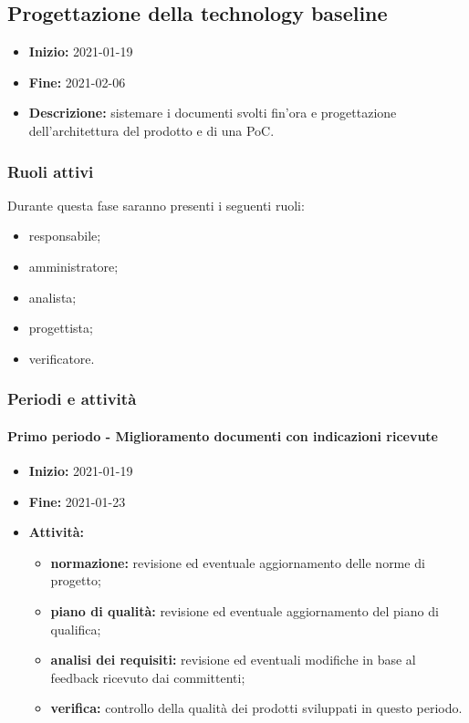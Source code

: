 \subsection{Progettazione della technology baseline} \label{_pianificazioneProgettazioneTechnologyBaseline}
\begin{itemize}
    \item []\textbf{Inizio:} 2021-01-19
    \item []\textbf{Fine:} 2021-02-06
    \item []\textbf{Descrizione:} sistemare i documenti svolti fin'ora e progettazione dell'architettura del prodotto e di una PoC.
\end{itemize}

\subsubsection{Ruoli attivi}
Durante questa fase saranno presenti i seguenti ruoli:
\begin{itemize}
    \item responsabile;
    \item amministratore;
    \item analista;
    \item progettista;
    \item verificatore.
\end{itemize}

\subsubsection{Periodi e attività}

\paragraph[Primo periodo]{Primo periodo - \textnormal{Miglioramento documenti con indicazioni ricevute}}
\begin{itemize}
    \item [] \textbf{Inizio:} 2021-01-19
    \item [] \textbf{Fine:} 2021-01-23
    \item [] \textbf{Attività:}
          \begin{itemize}
              \item \textbf{normazione:} revisione ed eventuale aggiornamento delle norme di progetto;
              \item \textbf{piano di qualità:} revisione ed eventuale aggiornamento del piano di qualifica;
              \item \textbf{analisi dei requisiti:} revisione ed eventuali modifiche in base al feedback ricevuto dai committenti;
              \item \textbf{verifica:} controllo della qualità dei prodotti sviluppati in questo periodo.
          \end{itemize}
\end{itemize}

